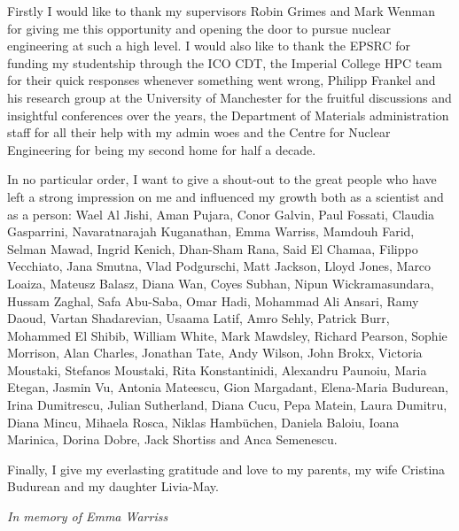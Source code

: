 \cleardoublepage


\begin{acknowledgements}

Firstly I would like to thank my supervisors Robin Grimes and Mark Wenman for giving me this opportunity and opening the door to pursue nuclear engineering at such a high level. I would also like to thank the EPSRC for funding my studentship through the ICO CDT, the Imperial College HPC team for their quick responses whenever something went wrong, Philipp Frankel and his research group at the University of Manchester for the fruitful discussions and insightful conferences over the years, the Department of Materials administration staff for all their help with my admin woes and the Centre for Nuclear Engineering for being my second home for half a decade.

In no particular order, I want to give a shout-out to the great people who have left a strong impression on me and influenced my growth both as a scientist and as a person: Wael Al Jishi, Aman Pujara, Conor Galvin, Paul Fossati, Claudia Gasparrini, Navaratnarajah Kuganathan, Emma Warriss, Mamdouh Farid, Selman Mawad, Ingrid Kenich, Dhan-Sham Rana, Said El Chamaa, Filippo Vecchiato, Jana Smutna, Vlad Podgurschi, Matt Jackson, Lloyd Jones, Marco Loaiza, Mateusz Balasz, Diana Wan, Coyes Subhan, Nipun Wickramasundara, Hussam Zaghal, Safa Abu-Saba, Omar Hadi, Mohammad Ali Ansari, Ramy Daoud, Vartan Shadarevian, Usaama Latif, Amro Sehly, Patrick Burr, Mohammed El Shibib, William White, Mark Mawdsley, Richard Pearson, Sophie Morrison, Alan Charles, Jonathan Tate, Andy Wilson, John Brokx, Victoria Moustaki, Stefanos Moustaki, Rita Konstantinidi, Alexandru Paunoiu, Maria Etegan, Jasmin Vu, Antonia Mateescu, Gion Margadant, Elena-Maria Budurean, Irina Dumitrescu, Julian Sutherland, Diana Cucu, Pepa Matein, Laura Dumitru, Diana Mincu, Mihaela Rosca, Niklas Hamb\"{u}chen, Daniela Baloiu, Ioana Marinica, Dorina Dobre, Jack Shortiss and Anca Semenescu. 

Finally, I give my everlasting gratitude and love to my parents, my wife Cristina Budurean and my daughter Livia-May.

\clearpage

\begin{center}
\emph{In memory of Emma Warriss}
\end{center}

\end{acknowledgements}
